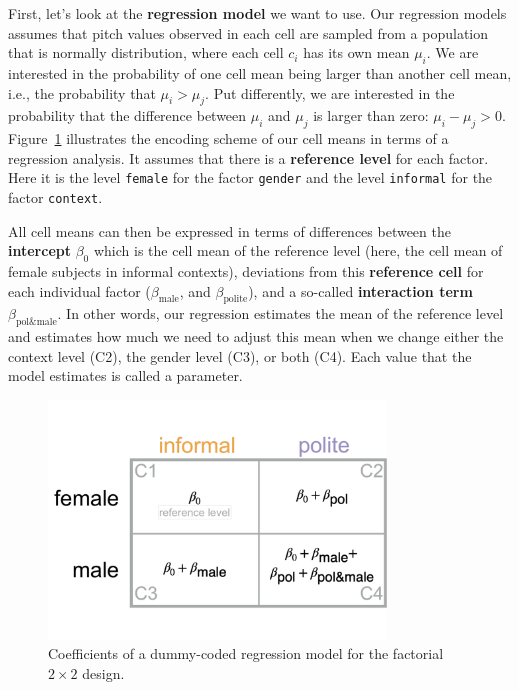 \documentclass[nobib]{tufte-handout}
\newcommand{\tr}[1]{\textcolor{DarkOrange}{[tr: #1]}}
\begin{document}
First, let's look at the \textbf{regression model} we want to use.
Our regression models assumes that pitch values observed in each cell are
sampled from a population that is normally distribution, where each cell $c_i$ has its own mean $\mu_i$. We are interested in the probability of one cell mean being larger than another cell mean, i.e., the probability that $\mu_i > \mu_j$. Put differently, we are interested in the probability that the difference between $\mu_i$ and $\mu_j$ is larger than zero: $\mu_i - \mu_j > 0$.
Figure~\ref{fig:coefficients_table} illustrates the encoding scheme of our cell means in terms of a regression analysis. It assumes that
there is a \textbf{reference level} for each factor. Here it is the level \texttt{female} for
the factor \texttt{gender} and the level \texttt{informal} for the factor
\texttt{context}. 
  
All cell means can then be expressed in terms of
differences between the \textbf{intercept} $\beta_0$ which is the cell mean of the reference level (here, the cell mean of female subjects in
informal contexts), deviations from this \textbf{reference cell} for each individual factor
($\beta_{\text{male}}$, and $\beta_{\text{polite}}$), and a so-called \textbf{interaction term}
$\beta_{\text{pol\&male}}$. In other words, our regression estimates the mean of the reference level and estimates how much we need to adjust this mean when we change either the context level (C2), the gender level (C3), or both (C4). Each value that the model estimates is called a parameter.

\begin{figure}[]
  \centering
    \includegraphics[width = 0.8\textwidth]{pics/table_coefficients.pdf}
    \caption{Coefficients of a dummy-coded regression model for the factorial $2 \times 2$ design.}
    \label{fig:coefficients_table}
\end{figure}
\end{document}
